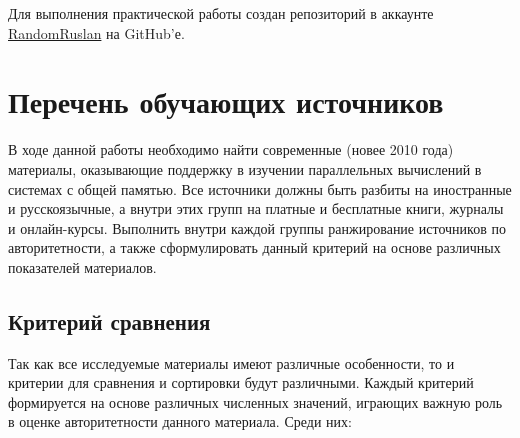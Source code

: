 \documentclass{article}
\begin{document}
		Для выполнения практической работы создан репозиторий в аккаунте \href{http://github.com/RandomRuslan/SMP_Practice}{RandomRuslan} на GitHub'е.\\
\newpage
\section{Перечень обучающих источников}
	В ходе данной работы необходимо найти современные (новее 2010 года) материалы, оказывающие поддержку в изучении параллельных вычислений в системах с общей памятью. Все источники должны быть разбиты на иностранные и русскоязычные, а внутри этих групп на платные и бесплатные книги, журналы и онлайн-курсы. Выполнить внутри каждой группы ранжирование источников по авторитетности, а также сформулировать данный критерий на основе различных показателей материалов.
	\subsection{Критерий сравнения}
	Так как все исследуемые материалы имеют различные особенности, то и критерии для сравнения и сортировки будут различными. Каждый критерий формируется на основе различных численных значений, играющих важную роль в оценке авторитетности данного материала. Среди них:
\end{document}
